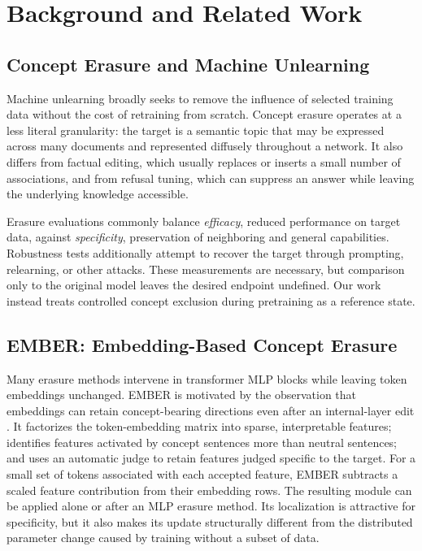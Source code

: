 \section{Background and Related Work}
\label{sec:related-work}

\subsection{Concept Erasure and Machine Unlearning}

Machine unlearning broadly seeks to remove the influence of selected training
data without the cost of retraining from scratch. Concept erasure operates at a
less literal granularity: the target is a semantic topic that may be expressed
across many documents and represented diffusely throughout a network. It also
differs from factual editing, which usually replaces or inserts a small number
of associations, and from refusal tuning, which can suppress an answer while
leaving the underlying knowledge accessible.

Erasure evaluations commonly balance \emph{efficacy}, reduced performance on
target data, against \emph{specificity}, preservation of neighboring and
general capabilities. Robustness tests additionally attempt to recover the
target through prompting, relearning, or other attacks. These measurements are
necessary, but comparison only to the original model leaves the desired
endpoint undefined. Our work instead treats controlled concept exclusion during
pretraining as a reference state.

\subsection{EMBER: Embedding-Based Concept Erasure}

Many erasure methods intervene in transformer MLP blocks while leaving token
embeddings unchanged. EMBER is motivated by the observation that embeddings
can retain concept-bearing directions even after an internal-layer edit
\citep{suslik2026ember}. It factorizes the token-embedding matrix into sparse,
interpretable features; identifies features activated by concept sentences more
than neutral sentences; and uses an automatic judge to retain features judged
specific to the target. For a small set of tokens associated with each accepted
feature, EMBER subtracts a scaled feature contribution from their embedding
rows. The resulting module can be applied alone or after an MLP erasure method.
Its localization is attractive for specificity, but it also makes its update
structurally different from the distributed parameter change caused by training
without a subset of data.

